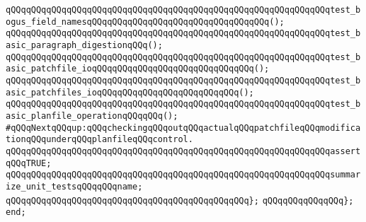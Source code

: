 \verb|qQQqqQQqqQQqqQQqqQQqqQQqqQQqqQQqqQQqqQQqqQQqqQQqqQQqqQQqqQQqqQQqtest_bogus_field_namesqQQqqQQqqQQqqQQqqQQqqQQqqQQqqQQqqQQq();|\newline
\verb|qQQqqQQqqQQqqQQqqQQqqQQqqQQqqQQqqQQqqQQqqQQqqQQqqQQqqQQqqQQqqQQqtest_basic_paragraph_digestionqQQq();|\newline
\verb|qQQqqQQqqQQqqQQqqQQqqQQqqQQqqQQqqQQqqQQqqQQqqQQqqQQqqQQqqQQqqQQqtest_basic_patchfile_ioqQQqqQQqqQQqqQQqqQQqqQQqqQQqqQQq();|\newline
\verb|qQQqqQQqqQQqqQQqqQQqqQQqqQQqqQQqqQQqqQQqqQQqqQQqqQQqqQQqqQQqqQQqtest_basic_patchfiles_ioqQQqqQQqqQQqqQQqqQQqqQQqqQQq();|\newline
\verb|qQQqqQQqqQQqqQQqqQQqqQQqqQQqqQQqqQQqqQQqqQQqqQQqqQQqqQQqqQQqqQQqtest_basic_planfile_operationqQQqqQQq();|\newline
\newline
\verb|#qQQqNextqQQqup:qQQqcheckingqQQqoutqQQqactualqQQqpatchfileqQQqmodificationqQQqunderqQQqplanfileqQQqcontrol.|\newline
\newline
\verb|qQQqqQQqqQQqqQQqqQQqqQQqqQQqqQQqqQQqqQQqqQQqqQQqqQQqqQQqqQQqqQQqassertqQQqTRUE;|\newline
\newline
\verb|qQQqqQQqqQQqqQQqqQQqqQQqqQQqqQQqqQQqqQQqqQQqqQQqqQQqqQQqqQQqqQQqsummarize_unit_testsqQQqqQQqname;|\newline
\verb|qQQqqQQqqQQqqQQqqQQqqQQqqQQqqQQqqQQqqQQqqQQqqQQq};|\newline
\verb|qQQqqQQqqQQqqQQq};|\newline
\verb|end;|\newline

